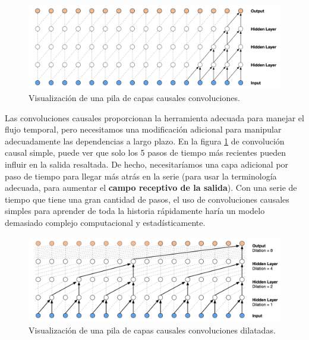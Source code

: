 \documentclass[a4paper,12pt]{article}
\begin{document}
\begin{figure}[H]
	\begin{center}				
		\includegraphics[width=1\textwidth]{stackcausal-conv.png}
		\caption{Visualización de una pila de capas causales convoluciones. \citep{wavenet2}}
		\label{fig:stackcausal-conv}
	\end{center}
\end{figure}

Las convoluciones causales proporcionan la herramienta adecuada para manejar el flujo temporal, pero necesitamos una modificación adicional para manipular adecuadamente las dependencias a largo plazo. En la figura \ref{fig:stackcausal-conv} de convolución causal simple, puede ver que solo los 5 pasos de tiempo más recientes pueden influir en la salida resaltada. De hecho, necesitaríamos una capa adicional por paso de tiempo para llegar más atrás en la serie (para usar la terminología adecuada, para aumentar el \textbf{campo receptivo de la salida}). Con una serie de tiempo que tiene una gran cantidad de pasos, el uso de convoluciones causales simples para aprender de toda la historia rápidamente haría un modelo demasiado complejo computacional y estadísticamente.

\begin{figure}[H]
	\begin{center}				
		\includegraphics[width=1\textwidth]{dilated-conv.png}
		\caption{Visualización de una pila de capas causales convoluciones dilatadas. \citep{wavenet2}}
		\label{fig:dilated-conv}
	\end{center}
\end{figure}
\end{document}
